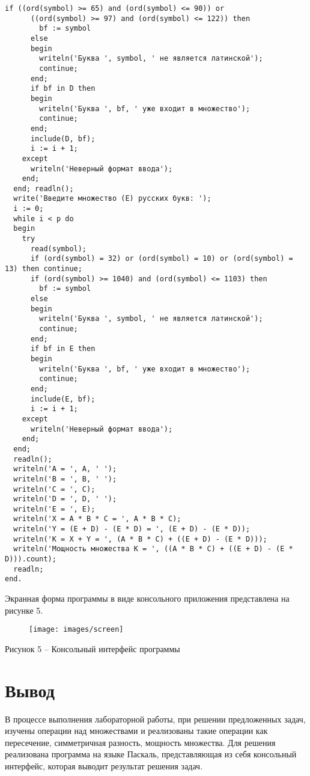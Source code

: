 \documentclass[a4paper,14pt]{extarticle}
\begin{document}
\begin{Verbatim}[tabsize=2]
      if ((ord(symbol) >= 65) and (ord(symbol) <= 90)) or 
      ((ord(symbol) >= 97) and (ord(symbol) <= 122)) then
        bf := symbol
      else
      begin
        writeln('Буква ', symbol, ' не является латинской');
        continue;
      end;
      if bf in D then
      begin
        writeln('Буква ', bf, ' уже входит в множество');
        continue;
      end;
      include(D, bf);
      i := i + 1;
    except
      writeln('Неверный формат ввода');
    end;
  end; readln();
  write('Введите множество (E) русских букв: ');
  i := 0;
  while i < p do
  begin
    try
      read(symbol);
      if (ord(symbol) = 32) or (ord(symbol) = 10) or (ord(symbol) = 13) then continue;
      if (ord(symbol) >= 1040) and (ord(symbol) <= 1103) then
        bf := symbol
      else
      begin
        writeln('Буква ', symbol, ' не является латинской');
        continue;
      end;
      if bf in E then
      begin
        writeln('Буква ', bf, ' уже входит в множество');
        continue;
      end;
      include(E, bf);
      i := i + 1;
    except
      writeln('Неверный формат ввода');
    end;
  end;
  readln();
  writeln('A = ', A, ' ');
  writeln('B = ', B, ' ');
  writeln('C = ', C);
  writeln('D = ', D, ' ');
  writeln('E = ', E);
  writeln('X = A * B * C = ', A * B * C);
  writeln('Y = (E + D) - (E * D) = ', (E + D) - (E * D));
  writeln('K = X + Y = ', (A * B * C) + ((E + D) - (E * D)));
  writeln('Мощность множества K = ', ((A * B * C) + ((E + D) - (E * D))).count);
  readln;
end.
  \end{Verbatim}
  
  Экранная форма программы в виде консольного приложения представлена на рисунке 5.
  \begin{figure}[h]
    \centering
    \texttt{[image: images/screen]}
  \end{figure}
  \begin{center}
    Рисунок 5 – Консольный интерфейс программы
  \end{center}
  
  \section*{Вывод}
  В процессе выполнения лабораторной работы, при решении предложенных задач, изучены операции над множествами и реализованы такие операции как пересечение, симметричная разность, мощность множества. Для решения реализована программа на языке Паскаль, представляющая из себя консольный интерфейс, которая выводит результат решения задач.
\end{document}
